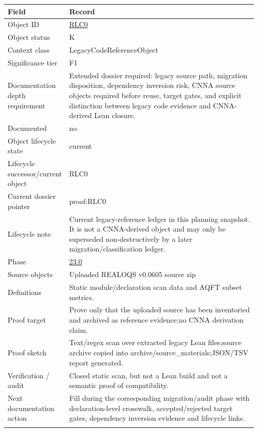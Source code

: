 \begin{longtable}{L{0.16\linewidth} L{0.81\linewidth}}
\hline
\textbf{Field} & \textbf{Record}\\
\hline
Object ID & \hyperlink{object-row-RLC0}{RLC0}\\
\hline\addlinespace[0.20em]
Object status & K\\
\hline\addlinespace[0.20em]
Context class & LegacyCodeReferenceObject\\
\hline\addlinespace[0.20em]
Significance tier & F1\\
\hline\addlinespace[0.20em]
Documentation depth requirement & Extended dossier required: legacy source path, migration disposition, dependency inversion risk, CNNA source objects required before reuse, target gates, and explicit distinction between legacy code evidence and CNNA-derived Lean closure.\\
\hline\addlinespace[0.20em]
Documented & no\\
\hline\addlinespace[0.20em]
Object lifecycle state & current\\
\hline\addlinespace[0.20em]
Lifecycle successor/\allowbreak{}current object & RLC0\\
\hline\addlinespace[0.20em]
Current dossier pointer & proof:RLC0\\
\hline\addlinespace[0.20em]
Lifecycle note & Current legacy-reference ledger in this planning snapshot. It is not a CNNA-derived object and may only be superseded non-destructively by a later migration/\allowbreak{}classification ledger.\\
\hline\addlinespace[0.20em]
Phase & \hyperlink{phase-row-23-0}{23.0}\\
\hline\addlinespace[0.20em]
Source objects & Uploaded REALOQS v0.0605 source zip\\
\hline\addlinespace[0.20em]
Definitions & Static module/\allowbreak{}declaration scan data and AQFT subset metrics.\\
\hline\addlinespace[0.20em]
Proof target & Prove only that the uploaded source has been inventoried and archived as reference evidence;\newline no CNNA derivation claim.\\
\hline\addlinespace[0.20em]
Proof sketch & Text/\allowbreak{}regex scan over extracted legacy Lean files;\newline source archive copied into archive/\allowbreak{}source\_materials;\newline JSON/\allowbreak{}TSV report generated.\\
\hline\addlinespace[0.20em]
Verification /\allowbreak{} audit & Closed static scan, but not a Lean build and not a semantic proof of compatibility.\\
\hline\addlinespace[0.20em]
Next documentation action & Fill during the corresponding migration/\allowbreak{}audit phase with declaration-level crosswalk, accepted/\allowbreak{}rejected target gates, dependency inversion evidence and lifecycle links.\\
\hline\addlinespace[0.20em]
\end{longtable}
